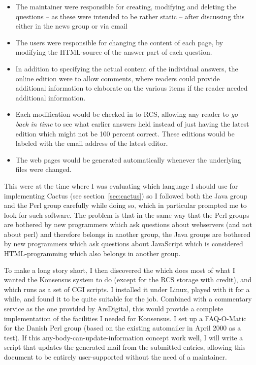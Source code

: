 \begin{itemize}
\item The maintainer were responsible for creating, modifying and
  deleting the questions -- as these were intended to be rather static
  -- after discussing this either in the news group or via email
\item The users were responsible for changing the content of each
  page, by modifying the HTML-source of the answer part of each
  question.

\item In addition to specifying the actual content of the individual
  answers, the online edition were to allow comments, where readers
  could provide additional information to elaborate on the various
  items if the reader needed additional information.
  
\item Each modification would be checked in to RCS, allowing any
  reader to \textit{go back in time} to see what earlier answers held
  instead of just having the latest edition which might not be 100
  percent correct.  These editions would be labeled with the email
  address of the latest editor.
  
\item The web pages would be generated automatically whenever the
  underlying files were changed.
  
\end{itemize}

This were at the time where I was evaluating which language I should
use for implementing Cactus (see section~\vref{sec:cactus}) so I
followed both the Java group and the Perl group carefully while doing
so, which in particular prompted me to look for such software.  The
problem is that in the same way that the Perl groups are bothered by
new programmers which ask questions about webservers (and not about
perl) and therefore belongs in another group, the Java groups are
bothered by new programmers which ask questions about JavaScript which
is considered HTML-programming which also belongs in another group.

To make a long story short, I then discovered the
which does most of what I wanted the Konsensus system to do (except
for the RCS storage with credit), and which runs as a set of CGI
scripts.  I installed it under Linux, played with it for a while, and
found it to be quite suitable for the job.  Combined with a commentary
service as the one provided by ArsDigital, this would provide a
complete implementation of the facilities I needed for Konsensus.  I
set up a FAQ-O-Matic for the Danish Perl group (based on the existing
automailer in April 2000 as a test).  If this
any-body-can-update-information concept work well, I will write a
script that updates the generated mail from the submitted entries,
allowing this document to be entirely user-supported without the need
of a maintainer.


  
